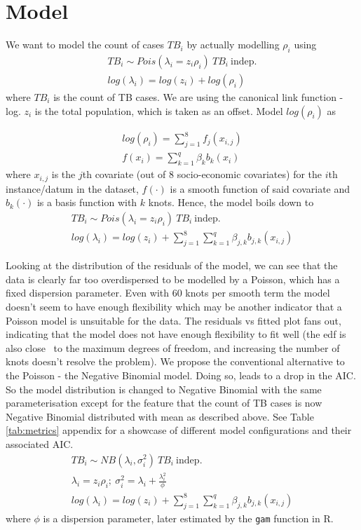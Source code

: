 \section{Model}
We want to model the count of cases $TB_i$ by actually modelling $\rho_i$ using
$$
\begin{aligned}
	TB_i \sim Pois(\lambda_i = z_i \rho_i) \ TB_i\  \mathrm{indep.} 
	\\
	log(\lambda_i) = log(z_i) + log(\rho_i)
\end{aligned}
$$
where $TB_i$ is the count of TB cases. We are using the canonical link function - log. $z_i$ is the total population, which is taken as an offset. Model $log(\rho_i)$ as

$$
\begin{aligned}
	log(\rho_i) = \sum_{j=1}^{8}f_{j}(x_{i,j})
	\\
	f(x_i) = \sum_{k=1}^{q}\beta_{k}b_{k}(x_i)
\end{aligned}
$$
where $x_{i,j}$ is the $j$th covariate (out of 8 socio-economic covariates) for the $i$th instance/datum in the dataset, $f(\cdot)$ is a smooth function of said covariate and $b_k(\cdot)$ is a basis function with $k$ knots. Hence, the model boils down to
$$
\begin{aligned}
	TB_i \sim Pois(\lambda_i = z_i \rho_i) \ TB_i\  \mathrm{indep.} 
	\\
	log(\lambda_i) = log(z_i) +  \sum_{j=1}^{8}\sum_{k=1}^{q}\beta_{j,k}b_{j,k}(x_{i,j})
\end{aligned}
$$

Looking at the distribution of the residuals of the model, we can see that the data is clearly far too overdispersed to be modelled by a Poisson, which has a fixed dispersion parameter. Even with 60 knots per smooth term the model doesn't seem to have enough flexibility which may be another indicator that a Poisson model is unsuitable for the data. The residuals vs fitted plot fans out, indicating that the model does not have enough flexibility to fit well (the edf is also close  to the maximum degrees of freedom, and increasing the number of knots doesn't resolve the problem). We propose the conventional alternative to the Poisson - the Negative Binomial model. Doing so, leads to a drop in the AIC. So the model distribution is changed to Negative Binomial with the same parameterisation except for
the feature that the count of TB cases is now Negative Binomial distributed with mean as described above.
See Table \ref{tab:metrics} appendix for a showcase of different model configurations and their associated AIC.
$$
\begin{aligned}
	TB_i \sim NB(\lambda_i , \sigma_i^2) \ TB_i\  \mathrm{indep.} 
	\\
	\lambda_i = z_i \rho_i ;\ \sigma_i^2 = \lambda_i +\frac{\lambda_i^2}{\phi}
	\\
	log(\lambda_i) = log(z_i) +  \sum_{j=1}^{8}\sum_{k=1}^{q}\beta_{j,k}b_{j,k}(x_{i,j})
\end{aligned}
$$
where $\phi$ is a dispersion parameter, later estimated by  the  \texttt{gam} function in R.



